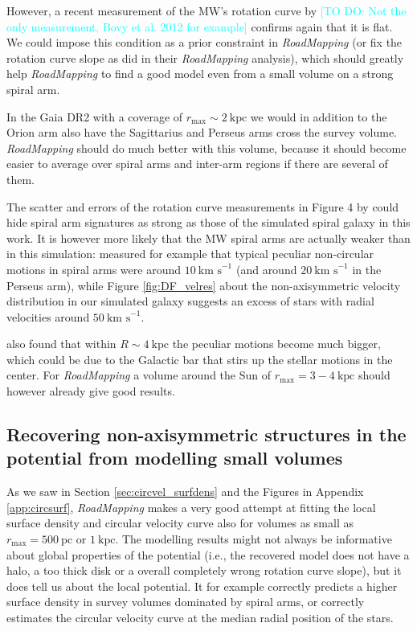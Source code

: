 \documentclass[iop,revtex4,numberedappendix,appendixfloats]{emulateapj}
\newcommand{\RM}{{\sl RoadMapping}}
\newcommand{\Jo}[1]{\textcolor{Cyan}{#1}}
\begin{document}
However, a recent measurement of the MW's rotation curve by \citet{2014ApJ...783..130R} \Jo{[TO DO: Not the only measurement, Bovy et al. 2012 for example]} confirms again that it is flat. We could impose this condition as a prior constraint in \RM{} (or fix the rotation curve slope as \citet{2013ApJ...779..115B} did in their \RM{} analysis), which should greatly help \RM{} to find a good model even from a small volume on a strong spiral arm. 

In the Gaia DR2 with a coverage of $r_\text{max}\sim2~\text{kpc}$ we would in addition to the Orion arm also have the Sagittarius and Perseus arms cross the survey volume. \RM{} should do much better with this volume, because it should become easier to average over spiral arms and inter-arm regions if there are several of them.

The scatter and errors of the rotation curve measurements in Figure 4 by \citet{2014ApJ...783..130R} could hide spiral arm signatures as strong as those of the simulated spiral galaxy in this work. It is however more likely that the MW spiral arms are actually weaker than in this simulation: \citet{2014ApJ...783..130R} measured for example that typical peculiar non-circular motions in spiral arms were around $10~\text{km s}^{−1}$ (and around $20~\text{km s}^{−1}$ in the Perseus arm), while Figure \ref{fig:DF_velres} about the non-axisymmetric velocity distribution in our simulated galaxy suggests an excess of stars with radial velocities around $50~\text{km s}^{-1}$.

\citet{2014ApJ...783..130R} also found that within $R\sim 4~\text{kpc}$ the peculiar motions become much bigger, which could be due to the Galactic bar that stirs up the stellar motions in the center. For \RM{} a volume around the Sun of $r_\text{max}=3-4~\text{kpc}$ should however already give good results. 

\subsection{Recovering non-axisymmetric structures in the potential from modelling small volumes}

As we saw in Section \ref{sec:circvel_surfdens} and the Figures in Appendix \ref{app:circsurf}, \RM{} makes a very good attempt at fitting the local surface density and circular velocity curve also for volumes as small as $r_\text{max}=500~\text{pc}$ or $1~\text{kpc}$. The modelling results might not always be informative about global properties of the potential (i.e., the recovered model does not have a halo, a too thick disk or a overall completely wrong rotation curve slope), but it does tell us about the local potential. It for example correctly predicts a higher surface density in survey volumes dominated by spiral arms, or correctly estimates the circular velocity curve at the median radial position of the stars. 
\end{document}
